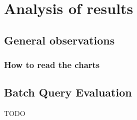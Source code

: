 \section{Analysis of results}


\subsection{General observations}

\subsubsection{How to read the charts}
% 
% 

\subsection{Batch Query Evaluation}

TODO

% 

% 


